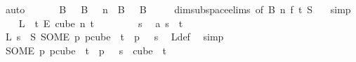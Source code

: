 \begin{isabellebody}
\ auto\isanewline
\ \ \isamarkupfalse%
\ \isamarkupfalse%
\ {}{\isacharcolon}{\kern0pt}\ {\isachardoublequoteopen}B\ {}\ {\isasymunion}\ B\ {}\ {\isacharequal}{\kern0pt}\ {\isacharbraceleft}{\kern0pt}{\isachardot}{\kern0pt}{\isachardot}{\kern0pt}{\isacharless}{\kern0pt}n{\isacharbraceright}{\kern0pt}\ {\isasymand}\ B\ {}\ {\isasyminter}\ B\ {}\ {\isacharequal}{\kern0pt}\ {\isacharbraceleft}{\kern0pt}{\isacharbraceright}{\kern0pt}{\isachardoublequoteclose}\ \isamarkupfalse%
\ dim{}{\isacharunderscore}{\kern0pt}subspace{\isacharunderscore}{\kern0pt}elims{\isacharparenleft}{\kern0pt}{}{\isacharcomma}{\kern0pt}\ {}{\isacharparenright}{\kern0pt}{\isacharbrackleft}{\kern0pt}of\ {\isachardoublequoteopen}B{\isachardoublequoteclose}\ {\isachardoublequoteopen}n{\isachardoublequoteclose}\ {\isachardoublequoteopen}f{\isachardoublequoteclose}\ {\isachardoublequoteopen}t{\isachardoublequoteclose}\ {\isachardoublequoteopen}S{\isachardoublequoteclose}\ {\isacharbrackright}{\kern0pt}\ \isamarkupfalse%
\ simp\isanewline
\isanewline
\ \ \isamarkupfalse%
\ {\isachardoublequoteopen}L\ {\isasymin}\ {\isacharbraceleft}{\kern0pt}{\isachardot}{\kern0pt}{\isachardot}{\kern0pt}{\isacharless}{\kern0pt}t{\isacharbraceright}{\kern0pt}\ {\isasymrightarrow}\isactrlsub E\ cube\ n\ t{\isachardoublequoteclose}\isanewline
\ \ \isamarkupfalse%
\isanewline
\ \ \ \ \isamarkupfalse%
\ s\ \isamarkupfalse%
\ a{\isacharcolon}{\kern0pt}\ {\isachardoublequoteopen}s\ {\isasymin}\ {\isacharbraceleft}{\kern0pt}{\isachardot}{\kern0pt}{\isachardot}{\kern0pt}{\isacharless}{\kern0pt}t{\isacharbraceright}{\kern0pt}{\isachardoublequoteclose}\isanewline
\ \ \ \ \isamarkupfalse%
\ \isamarkupfalse%
\ {\isachardoublequoteopen}L\ s\ {\isacharequal}{\kern0pt}\ S\ {\isacharparenleft}{\kern0pt}SOME\ p{\isachardot}{\kern0pt}\ p{\isasymin}cube\ {}\ t\ {\isasymand}\ p\ {}\ {\isacharequal}{\kern0pt}\ s{\isacharparenright}{\kern0pt}{\isachardoublequoteclose}\ \isamarkupfalse%
\ L{\isacharunderscore}{\kern0pt}def\ \isamarkupfalse%
\ simp\isanewline
\ \ \ \ \isamarkupfalse%
\ \isamarkupfalse%
\ {\isachardoublequoteopen}{\isacharparenleft}{\kern0pt}SOME\ p{\isachardot}{\kern0pt}\ p{\isasymin}cube\ {}\ t\ {\isasymand}\ p\ {}\ {\isacharequal}{\kern0pt}\ s{\isacharparenright}{\kern0pt}\ {\isasymin}\ cube\ {}\ t{\isachardoublequoteclose}\ \isamarkupfalse%

\end{isabellebody}
